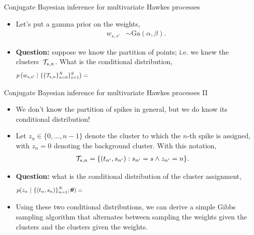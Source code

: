 \documentclass[aspectratio=169]{beamer}
\begin{document}
\begin{frame}[t]{Conjugate Bayesian inference for multivariate Hawkes processes}
    \begin{itemize}
        \itemsep1em
        
        \item Let's put a gamma prior on the weights, 
        \begin{align}
            w_{s,s'} &\sim \mathrm{Ga}(\alpha, \beta).
        \end{align}
        
        \item \textbf{Question:} suppose we know the partition of points; i.e. we knew the clusters~$\mathcal{T}_{s,n}$. What is the conditional distribution,
        \begin{align}
            p\left(w_{s,s'} \mid \{\{\cT_{s,n}\}_{n=0}^N\}_{s=1}^S \right) &= \hspace{30em}
        \end{align}
    \end{itemize}
\end{frame}

\begin{frame}[t]{Conjugate Bayesian inference for multivariate Hawkes processes II}
    \begin{itemize}
        \itemsep1em
        
        \item We don't know the partition of spikes in general, but we do know its conditional distribution!
        
        \item Let $z_n \in \{0, \ldots, n-1\}$ denote the cluster to which the $n$-th spike is assigned, with $z_n=0$ denoting the background cluster. With this notation,
        \begin{align}
            \mathcal{T}_{s,n} &= \{(t_{n'}, s_{n'}): s_{n'}=s \wedge z_{n'}=n\}.
        \end{align}
        
        \item \textbf{Question:} what is the conditional distribution of the cluster assignment,
        \begin{align}
            p(z_n \mid \{(t_n, s_n)\}_{n=1}^N; \mbtheta) &= \hspace{30em}
        \end{align}
        
        \item Using these two conditional distributions, we can derive a simple Gibbs sampling algorithm that alternates between sampling the weights given the clusters and the clusters given the weights.
    \end{itemize}
\end{frame}
\end{document}
